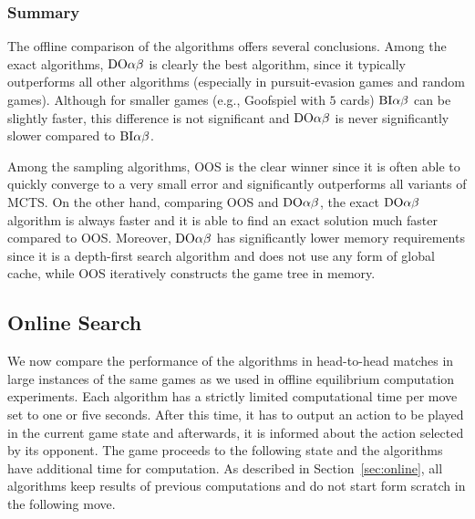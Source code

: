 \subsubsection{Summary}

The offline comparison of the algorithms offers several conclusions.
Among the exact algorithms, $\textrm{DO}\alpha\beta$ is clearly the best algorithm, since it typically outperforms all other algorithms (especially in pursuit-evasion games and random games). Although for smaller games (e.g., Goofspiel with $5$ cards)  $\textrm{BI}\alpha\beta$ can be slightly faster, this difference is not significant and $\textrm{DO}\alpha\beta$ is never significantly slower compared to $\textrm{BI}\alpha\beta$.

Among the sampling algorithms, OOS is the clear winner since it is often able to quickly converge to a very small error and significantly outperforms all variants of MCTS.
On the other hand, comparing OOS and $\textrm{DO}\alpha\beta$, the exact $\textrm{DO}\alpha\beta$ algorithm is always faster and it is able to find an exact solution much faster compared to OOS.
Moreover, $\textrm{DO}\alpha\beta$ has significantly lower memory requirements since it is a depth-first search algorithm and does not use any form of global cache, while OOS iteratively constructs the game tree in memory.


\subsection{Online Search}

We now compare the performance of the algorithms in head-to-head matches in large instances of the same games as we used in offline equilibrium computation experiments. Each algorithm has a strictly limited computational time per move set to one or five seconds. After this time, it has to output an action to be played in the current game state and afterwards, it is informed about the action selected by its opponent. The game proceeds to the following state and the algorithms have additional time for computation. As described in Section~\ref{sec:online}, all algorithms keep results of previous computations and do not start form scratch in the following move. 

